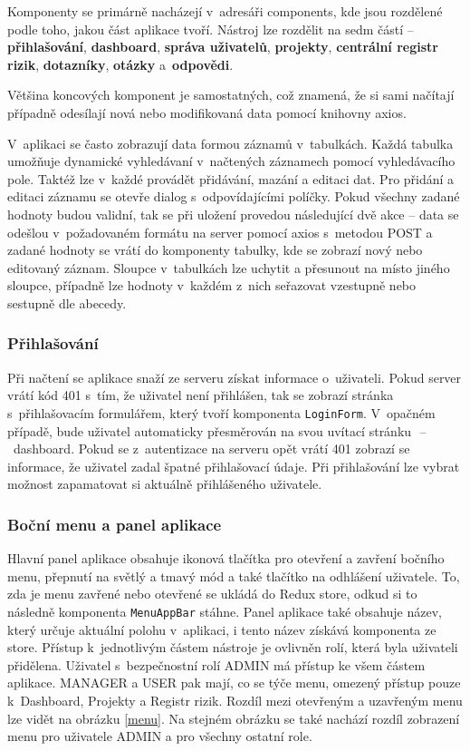 Komponenty se primárně nacházejí v~adresáři components, kde jsou rozdělené podle toho, jakou část aplikace tvoří. Nástroj lze rozdělit na sedm částí – \textbf{přihlašování}, \textbf{dashboard}, \textbf{správa uživatelů}, \textbf{projekty}, \textbf{centrální registr rizik}, \textbf{dotazníky}, \textbf{otázky} a~\textbf{odpovědi}. 

Většina koncových komponent je samostatných, což znamená, že si sami načítají případně odesílají nová nebo modifikovaná data pomocí knihovny axios.

V~aplikaci se často zobrazují data formou záznamů v~tabulkách. Každá tabulka umožňuje dynamické vyhledávaní v~načtených záznamech pomocí vyhledávacího pole. Taktéž lze v~každé provádět přidávání, mazání a editaci dat. Pro přidání a editaci záznamu se otevře dialog s~odpovídajícími políčky. Pokud všechny zadané hodnoty budou validní, tak se při uložení provedou následující dvě akce – data se odešlou v~požadovaném formátu na server pomocí axios s~metodou POST a zadané hodnoty se vrátí do komponenty tabulky, kde se zobrazí nový nebo editovaný záznam. Sloupce v~tabulkách lze uchytit a přesunout na místo jiného sloupce, případně lze hodnoty v~každém z~nich seřazovat vzestupně nebo sestupně dle abecedy.

\subsubsection *{Přihlašování}

Při načtení se aplikace snaží ze serveru získat informace o~uživateli.  Pokud server vrátí kód 401 s~tím, že uživatel není přihlášen, tak se zobrazí stránka s~přihlašovacím formulářem, který tvoří komponenta \texttt{LoginForm}. V~opačném případě, bude uživatel automaticky přesměrován na svou uvítací stránku~\,--\,~dashboard. Pokud se z~autentizace na serveru opět vrátí 401 zobrazí se informace, že uživatel zadal špatné přihlašovací údaje. Při přihlašování lze vybrat možnost zapamatovat si aktuálně přihlášeného uživatele.

\subsubsection *{Boční menu a panel aplikace}

Hlavní panel aplikace obsahuje ikonová tlačítka pro otevření a zavření bočního menu, přepnutí na světlý a tmavý mód a také tlačítko na odhlášení uživatele. To, zda je menu zavřené nebo otevřené se ukládá do Redux store, odkud si to následně komponenta \texttt{MenuAppBar} stáhne. Panel aplikace také obsahuje název, který určuje aktuální polohu v~aplikaci, i tento název získává komponenta ze store.
Přístup k~jednotlivým částem nástroje je ovlivněn rolí, která byla uživateli přidělena. Uživatel s~bezpečnostní rolí ADMIN má přístup ke všem částem aplikace. MANAGER a USER pak mají, co se týče menu, omezený přístup pouze k~Dashboard, Projekty a Registr rizik. Rozdíl mezi otevřeným a uzavřeným menu lze vidět na obrázku \ref{menu}. Na stejném obrázku se také nachází rozdíl zobrazení menu pro uživatele ADMIN a pro všechny ostatní role. 

